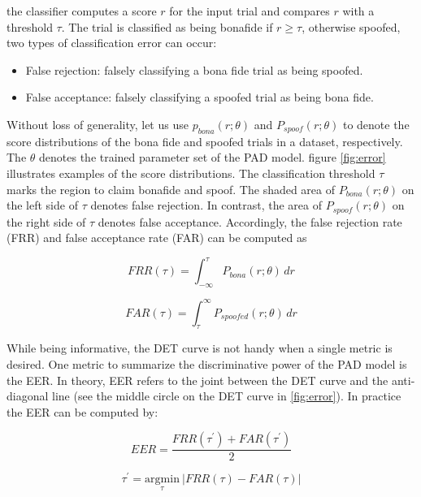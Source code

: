 the classifier computes a score $r$ for the 
input trial and compares $r$ with a threshold $\tau$. The trial is classified as being
bonafide if $r \geq \tau$, otherwise
spoofed, two types of classification error can occur:

\begin{itemize}
    \item False rejection: falsely classifying a bona fide trial as being spoofed.
    \item False acceptance: falsely classifying a spoofed trial as being bona fide.
\end{itemize}

Without loss of generality, let us use \(p_{bona}(r;\theta)\) and \(P_{spoof}(r;\theta)\) to denote the score distributions of the bona fide and spoofed trials in a dataset, respectively.
The \(\theta\) denotes the trained parameter set of the PAD model. figure \ref{fig:error} illustrates examples of the score distributions. The classification threshold \(\tau\) marks the
region to claim bonafide and spoof. The shaded area of \(P_{bona}(r;\theta)\) on the left
side of \(\tau\) denotes false rejection. In contrast, the area of \(P_{spoof}(r;\theta)\) on the right side of \(\tau\) denotes false acceptance. Accordingly, the false rejection rate (FRR) and false acceptance rate (FAR) can be computed as 

\begin{equation}
    FRR(\tau) = \int_{-\infty}^{\tau} P_{bona}(r;\theta) \,dr
\end{equation}

\begin{equation}
    FAR(\tau) = \int_{\tau}^{\infty} P_{spoofed}(r;\theta) \,dr
\end{equation}

While being informative, the DET curve is not handy when a single metric is desired. One metric to summarize the discriminative power of the PAD model is the EER. In theory, EER refers to the joint between the DET curve and the anti-diagonal line (see the middle circle on the DET curve in \ref{fig:error}). In practice the EER can be computed by:

\begin{equation}
    EER = \frac{FRR(\tau^{\prime}) + FAR(\tau^{\prime})}{2}
\end{equation}

\begin{equation}
    \tau^{\prime} = \underset{\tau}{\mathrm{arg min}} \ |FRR(\tau)-FAR(\tau)|
\end{equation}

